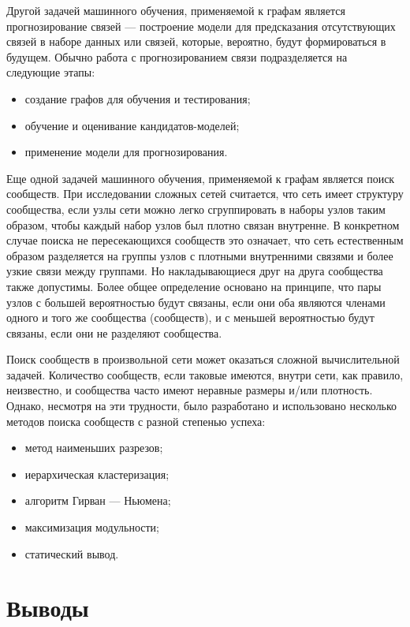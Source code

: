 Другой задачей машинного обучения, применяемой к графам является прогнозирование связей — построение модели для предсказания отсутствующих
связей в наборе данных или связей, которые, вероятно, будут формироваться в будущем. Обычно работа с прогнозированием связи подразделяется
на следующие этапы:

\begin{itemize}
    \item создание графов для обучения и тестирования;
    \item обучение и оценивание кандидатов-моделей;
    \item применение модели для прогнозирования.
\end{itemize}

Еще одной задачей машинного обучения, применяемой к графам является поиск сообществ. При исследовании сложных сетей считается, что сеть имеет
структуру сообщества, если узлы сети можно легко сгруппировать в наборы узлов таким образом, чтобы каждый набор узлов был плотно связан
внутренне. В конкретном случае поиска не пересекающихся сообществ это означает, что сеть естественным образом разделяется на группы узлов с
плотными внутренними связями и более узкие связи между группами. Но накладывающиеся друг на друга сообщества также допустимы. Более общее
определение основано на принципе, что пары узлов с большей вероятностью будут связаны, если они оба являются членами одного и того же
сообщества (сообществ), и с меньшей вероятностью будут связаны, если они не разделяют сообщества.

Поиск сообществ в произвольной сети может оказаться сложной вычислительной задачей. Количество сообществ, если таковые имеются, внутри сети,
как правило, неизвестно, и сообщества часто имеют неравные размеры и/или плотность. Однако, несмотря на эти трудности, было разработано и
использовано несколько методов поиска сообществ с разной степенью успеха:

\begin{itemize}
    \item метод наименьших разрезов;
    \item иерархическая кластеризация;
    \item алгоритм Гирван — Ньюмена;
    \item максимизация модульности;
    \item статический вывод.
\end{itemize}


\section{Выводы}

